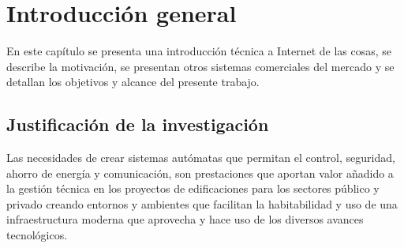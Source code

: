 
\chapter{Introducción general} %

\label{Chapter1} %
\label{IntroGeneral}
En este capítulo se presenta una introducción técnica a Internet de las cosas, se describe la motivación, se presentan otros sistemas comerciales del mercado y se detallan los objetivos y alcance del presente trabajo.

\newcommand{\keyword}[1]{\textbf{#1}}
\newcommand{\tabhead}[1]{\textbf{#1}}
\newcommand{\code}[1]{\texttt{#1}}
\newcommand{\file}[1]{\texttt{\bfseries#1}}
\newcommand{\option}[1]{\texttt{\itshape#1}}
\newcommand{\grados}{$^{\circ}$}






\section{Justificación de la investigación}

Las necesidades de crear sistemas autómatas que permitan el control, seguridad, ahorro de energía y comunicación, son prestaciones que aportan valor añadido a la gestión técnica en los proyectos de edificaciones para los sectores público y privado creando entornos y ambientes que facilitan la habitabilidad y uso de una infraestructura moderna que aprovecha y hace uso de los diversos avances tecnológicos.

